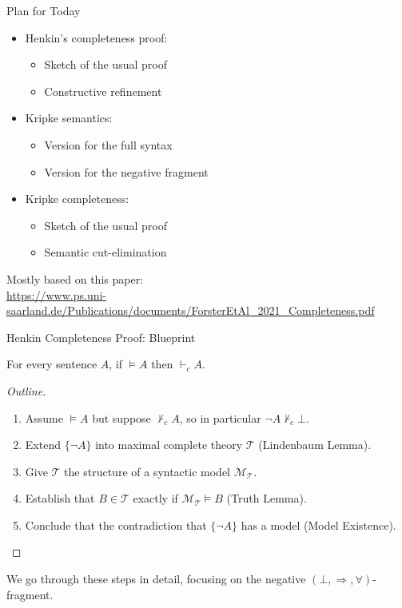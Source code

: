 \documentclass[xcolor=dvipsnames,aspectratio=169,handout]{beamer}
\renewcommand{\to}{\Rightarrow}
\newcommand{\TT}{\mathcal{T}}
\newcommand{\MM}{\mathcal{M}}
\begin{document}
\begin{frame}{Plan for Today}
	\begin{itemize}
		\item 
		Henkin's completeness proof:
		\begin{itemize}
			\item
			Sketch of the usual proof
			\item
			Constructive refinement
		\end{itemize}
		\vspace{0.3cm}
		\item
		Kripke semantics:
		\begin{itemize}
			\item
			Version for the full syntax
			\item
			Version for the negative fragment
		\end{itemize}
		\vspace{0.3cm}
		\item
		Kripke completeness:
		\begin{itemize}
			\item
			Sketch of the usual proof
			\item
			Semantic cut-elimination
		\end{itemize}
	\end{itemize}
	
	\vspace{0.5cm}
	Mostly based on this paper:\\ \scriptsize \url{https://www.ps.uni-saarland.de/Publications/documents/ForsterEtAl_2021_Completeness.pdf}
\end{frame}

\begin{frame}{Henkin Completeness Proof: Blueprint}
	\begin{theorem}
		For every sentence $A$, if $\vDash A$ then $\vdash_c A$.
	\end{theorem}
	\pause
	\begin{proof}[Outline]
		\begin{enumerate}
			\pause
			\item
			Assume $\vDash A$ but suppose $\not\vdash_c A$, so in particular $\neg A \not\vdash_c \bot$.
			\pause
			\item
			Extend $\{\neg A\}$ into maximal complete theory $\TT$ (Lindenbaum Lemma).
			\pause
			\item
			Give $\TT$ the structure of a syntactic model $\MM_\TT$.
			\pause
			\item
			Establish that $B\in \TT$ exactly if $\MM_\TT\vDash B$ (Truth Lemma).
			\pause
			\item
			Conclude that the contradiction that $\{\neg A\}$ has a model (Model Existence).
			\qedhere
		\end{enumerate}
	\end{proof}
	
	\pause
	We go through these steps in detail, focusing on the negative $(\bot,\to,\forall)$-fragment.
\end{frame}
\end{document}
